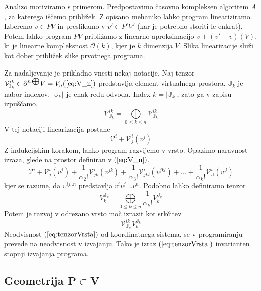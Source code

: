 \documentclass{article}
\newcommand{\JJ}{\mathbb{J}}
\newcommand{\VV}{\mathcal{V}}
\newcommand{\op}[1]{\partial^{#1\bigoplus}}
\begin{document}
 Analizo motiviramo s primerom. Predpostavimo časovno kompleksen algoritem $A$, za katerega iščemo približek. Z opisano mehaniko lahko program lineariziramo.
 Izberemo $v\in PV$ in preslikamo v $v'\in P'V'$ (kar je potrebno storiti le enkrat). Potem lahko program $PV$ približamo z linearno aproksimacijo $v+(v'-v) (V)$, ki je linearne kompleksnost $\mathcal{O}(k)$, kjer je $k$ dimenzija $V$.
 Slika linearizacije služi kot dober približek slike prvotnega programa.
 
 
 Za nadaljevanje je prikladno vnesti nekaj notacije. Naj tenzor $\VV^{ik}_{\JJ_k}\in\op{n}V=V_n (\ref{eq:V_n})$ predstavlja element virtualnega prostora. $\JJ_k$ je nabor indexov, $\lvert\JJ_k\rvert$ je enak redu odvoda. Index $k=\lvert\JJ_k\rvert$, zato ga v zapisu izpuščamo. 
 \begin{equation}
 	\VV^{ik}_{\JJ_k}= \bigoplus\limits_{0\le k\le n} \VV^{ik}_{\JJ_k}
 \end{equation}
 V tej notaciji linearizacija postane
 \begin{equation}\label{eq:linear}
	\VV^i+\VV^i_j(v^j)
 \end{equation}
 Z indukcijskim korakom, lahko program razvijemo v vrsto. Opazimo naravnost izraza, glede na prostor definiran v $(\ref{eq:V_n})$.
 \begin{equation}\label{eq:vrsta}
 	\VV^i +\VV^i_j(v^j)+\frac{1}{\alpha_2!}\VV^i_{jk}(v^{jk})+\frac{1}{\alpha_3!}\VV^i_{jkl}(v^{jkl})+...+\frac{1}{\alpha_k!}\VV^i_\JJ(v^\JJ)
 \end{equation}
kjer se razume, da $v^{ij..n}$ predstavlja $v^iv^j...v^n$.
Podobno lahko definiramo tenzor
\begin{equation}\label{eq:tenzor}
	V^{\JJ_k}_{k}=\bigoplus\limits_{0\le k\le n} \frac{1}{\alpha_k!}V^{\JJ_k}_{k}
\end{equation}
Potem je razvoj v odrezano vrsto moč izrazit kot srkčitev
\begin{equation}\label{eq:tenzorVrsta}
	\VV^{ik}_{\JJ_k}V^{\JJ_k}_{k}
\end{equation}
Neodvisnost $(\ref{eq:tenzorVrsta})$ od koordinatnega sistema, se v programiranju prevede na neodvisnost v izvajanju. Tako je izraz $(\ref{eq:tenzorVrsta})$ invarianten stopnji izvajanja programa. 
\subsection{Geometrija P$\subset$V}
\end{document}
